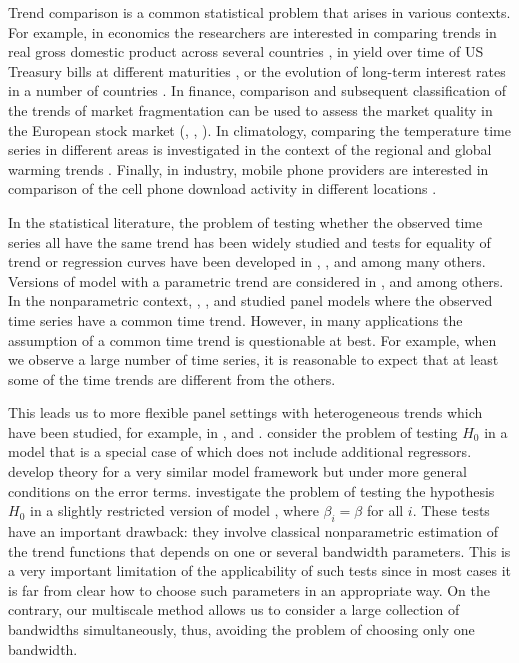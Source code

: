 \documentclass[a4paper,12pt]{article}
\makeatletter
\renewcommand{\eqref}[1]{\tagform@{\ref{#1}}}
\makeatother
\begin{document}
Trend comparison is a common statistical problem that arises in various contexts. For example, in economics the researchers are interested in comparing trends in real gross domestic product across several countries \citep[][]{Grier1989}, in yield over time of US Treasury bills at different maturities \citep[][]{Park2009}, or the evolution of long-term interest rates in a number of countries \citep[][]{Christiansen1997}. In finance, comparison and subsequent classification of the trends of market fragmentation can be used to assess the market quality in the European stock market (\citeauthor{VogtLinton2017}, \citeyear{VogtLinton2017}, \citeyear{VogtLinton2020}). In climatology, comparing the temperature time series in different areas is investigated in the context of the regional and global warming trends   \citep[][]{KarolyWu2005}. Finally, in industry, mobile phone providers are interested in comparison of the cell phone download activity in different locations \citep[][]{DegrasWu2012}.


In the statistical literature, the problem of testing whether the observed time series all have the same trend  has been widely studied and tests for equality of trend or regression curves have been developed in \cite{HaerdleMarron1990}, \cite{Hall1990}, \cite{Delgado1993} and \cite{DegrasWu2012} among many others. Versions of \linebreak model \eqref{eq:model} with a parametric trend are considered in \cite{Vogelsang2005}, \cite{Sun2011} and \cite{Xu2012} among others. In the nonparametric context, \cite{LiChenGao2010}, \cite{Atak2011}, \cite{Robinson2012} and \cite{ChenGaoLi2012} studied panel models where the observed time series have a common time trend. However, in many applications the assumption of a common time trend is questionable at best. For example, when we observe a large number of time series, it is reasonable to expect that at least some of the time trends are different from the others. 

This leads us to more flexible panel settings with heterogeneous trends which have been studied, for example, in \cite{DegrasWu2012},  \cite{Zhang2012} and \cite{Hidalgo2014}. \cite{DegrasWu2012} consider the problem of testing $H_0$ in a model that is a special case of \eqref{eq:model} which does not include additional regressors. \cite{ChenWu2018} develop theory for a very similar model framework but under more general conditions on the error terms. \cite{Zhang2012} investigate the problem of testing the hypothesis $H_0$ in a slightly restricted version of model \eqref{eq:model}, where $\beta_i = \beta$ for all $i$. These tests have an important drawback: they involve classical nonparametric estimation of the trend functions that depends on one or several bandwidth parameters. This is a very important limitation of the applicability of such tests since in most cases it is far from clear how to choose such parameters in an appropriate way. On the contrary, our multiscale method allows us to consider a large collection of bandwidths simultaneously, thus, avoiding the problem of choosing only one bandwidth.
\end{document}
